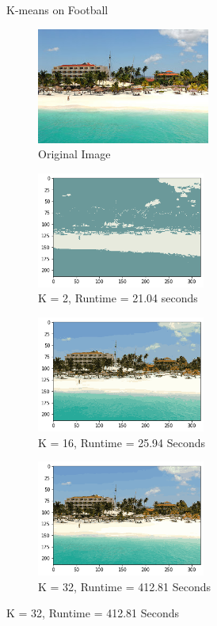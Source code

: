 \documentclass[twoside,10pt]{article}
\begin{document}
\begin{enumerate}
\begin{itemize}
\begin{figure}
\caption{K-means on Football}
\label{fig:fig}
\end{figure}   
  
  
  
    \begin{figure}
    \begin{subfigure}{.5\textwidth}
  \centering
  \includegraphics[height=1.5in]{Images/beach.png}  
  \caption{Original Image}
  \label{fig:sub-first}
\end{subfigure}
\begin{subfigure}{.5\textwidth}
  \centering
  \includegraphics[height=1.5in]{Images/Beachkmeans2.png}  
  \caption{K = 2, Runtime = 21.04 seconds}
  \label{fig:sub-first}
\end{subfigure}
\begin{subfigure}{.5\textwidth}
  \centering
  \includegraphics[height=1.5in]{Images/Beachkmeans16.png}  
  \caption{K = 16, Runtime = 25.94 Seconds}
  \label{fig:sub-second}
\end{subfigure}
\begin{subfigure}{.5\textwidth}
  \centering
  \includegraphics[height=1.5in]{Images/Beachkmeans32.png}  
  \caption{K = 32, Runtime = 412.81 Seconds}
  \label{fig:sub-third}
\end{subfigure}


\end{figure}
\end{itemize}
\end{enumerate}
\end{document}
